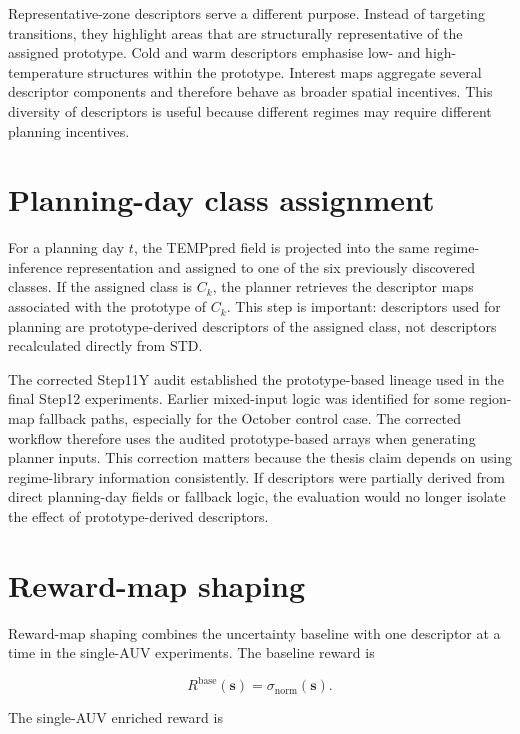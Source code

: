 Representative-zone descriptors serve a different purpose. Instead of targeting transitions, they highlight areas that are structurally representative of the assigned prototype. Cold and warm descriptors emphasise low- and high-temperature structures within the prototype. Interest maps aggregate several descriptor components and therefore behave as broader spatial incentives. This diversity of descriptors is useful because different regimes may require different planning incentives.

\section{Planning-day class assignment}

For a planning day $t$, the TEMPpred field is projected into the same regime-inference representation and assigned to one of the six previously discovered classes. If the assigned class is $C_k$, the planner retrieves the descriptor maps associated with the prototype of $C_k$. This step is important: descriptors used for planning are prototype-derived descriptors of the assigned class, not descriptors recalculated directly from STD.

The corrected Step11Y audit established the prototype-based lineage used in the final Step12 experiments. Earlier mixed-input logic was identified for some region-map fallback paths, especially for the October control case. The corrected workflow therefore uses the audited prototype-based arrays when generating planner inputs. This correction matters because the thesis claim depends on using regime-library information consistently. If descriptors were partially derived from direct planning-day fields or fallback logic, the evaluation would no longer isolate the effect of prototype-derived descriptors.

\section{Reward-map shaping}

Reward-map shaping combines the uncertainty baseline with one descriptor at a time in the single-AUV experiments. The baseline reward is

\begin{equation}
R^{\mathrm{base}}(\mathbf{s}) =
\sigma_{\mathrm{norm}}(\mathbf{s}).
\label{eq:ch5_baseline_reward}
\end{equation}

The single-AUV enriched reward is

